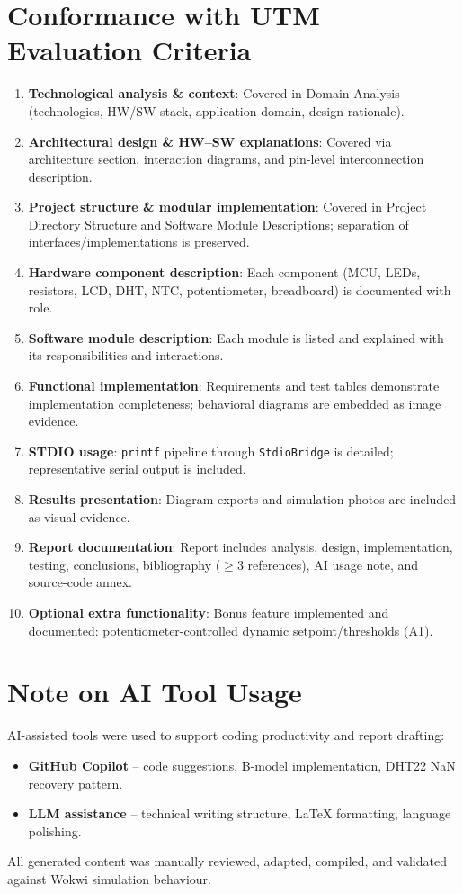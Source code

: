 \documentclass[12pt]{article}
\begin{document}
\section*{Conformance with UTM Evaluation Criteria}
\begin{enumerate}
    \item \textbf{Technological analysis \& context}: Covered in Domain Analysis (technologies, HW/SW stack, application domain, design rationale).
    \item \textbf{Architectural design \& HW--SW explanations}: Covered via architecture section, interaction diagrams, and pin-level interconnection description.
    \item \textbf{Project structure \& modular implementation}: Covered in Project Directory Structure and Software Module Descriptions; separation of interfaces/implementations is preserved.
    \item \textbf{Hardware component description}: Each component (MCU, LEDs, resistors, LCD, DHT, NTC, potentiometer, breadboard) is documented with role.
    \item \textbf{Software module description}: Each module is listed and explained with its responsibilities and interactions.
    \item \textbf{Functional implementation}: Requirements and test tables demonstrate implementation completeness; behavioral diagrams are embedded as image evidence.
    \item \textbf{STDIO usage}: \texttt{printf} pipeline through \texttt{StdioBridge} is detailed; representative serial output is included.
    \item \textbf{Results presentation}: Diagram exports and simulation photos are included as visual evidence.
    \item \textbf{Report documentation}: Report includes analysis, design, implementation, testing, conclusions, bibliography ($\geq$3 references), AI usage note, and source-code annex.
    \item \textbf{Optional extra functionality}: Bonus feature implemented and documented: potentiometer-controlled dynamic setpoint/thresholds (A1).
\end{enumerate}

\section*{Note on AI Tool Usage}
\hspace{0.8cm} AI-assisted tools were used to support coding productivity and report drafting:
\begin{itemize}
    \item \textbf{GitHub Copilot} -- code suggestions, B-model implementation, DHT22 NaN recovery pattern.
    \item \textbf{LLM assistance} -- technical writing structure, LaTeX formatting, language polishing.
\end{itemize}
All generated content was manually reviewed, adapted, compiled, and validated against Wokwi simulation behaviour.
\end{document}
